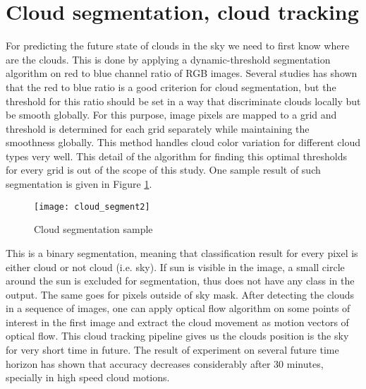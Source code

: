 
\section{Cloud segmentation, cloud tracking}
For predicting the future state of clouds in the sky we need to first know where are the clouds. This is done by applying a dynamic-threshold segmentation algorithm on red to blue channel ratio of RGB images. Several studies has shown that the red to blue ratio is a good criterion for cloud segmentation, but the threshold for this ratio should be set in a way that discriminate clouds locally but be smooth globally. For this purpose, image pixels are mapped to a grid and threshold is determined for each grid separately while maintaining the smoothness globally. This method handles cloud color variation for different cloud types very well. This detail of the algorithm for finding this optimal thresholds for every grid is out of the scope of this study. One sample result of such segmentation is given in Figure \ref{fig:cloud_seg}.
\begin{figure}[h]
\caption{Cloud segmentation sample}
\label{fig:cloud_seg}
\texttt{[image: cloud\_segment2]}
\centering
\end{figure}

This is a binary segmentation, meaning that classification result for every pixel is either cloud or not cloud (i.e. sky). If sun is visible in the image, a small circle around the sun is excluded for segmentation, thus does not have any class in the output. The same goes for pixels outside of sky mask. After detecting the clouds in a sequence of images, one can apply optical flow algorithm on some points of interest in the first image and extract the cloud movement as motion vectors of optical flow. This cloud tracking pipeline gives us the clouds position is the sky for very short time in future. The result of experiment on several future time horizon has shown that accuracy decreases considerably after 30 minutes, specially in high speed cloud motions.

